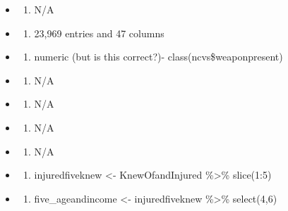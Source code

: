 \documentclass[
]{book}
\providecommand{\tightlist}{%
  \setlength{\itemsep}{0pt}\setlength{\parskip}{0pt}}
\begin{document}
\begin{itemize}
\item
  \begin{enumerate}
  \def\labelenumi{\arabic{enumi}.}
  \tightlist
  \item
    N/A
  \end{enumerate}
\item
  \begin{enumerate}
  \def\labelenumi{\arabic{enumi}.}
  \setcounter{enumi}{1}
  \tightlist
  \item
    23,969 entries and 47 columns
  \end{enumerate}
\item
  \begin{enumerate}
  \def\labelenumi{\arabic{enumi}.}
  \setcounter{enumi}{2}
  \tightlist
  \item
    numeric (but is this correct?)- class(ncvs\$weaponpresent)
  \end{enumerate}
\item
  \begin{enumerate}
  \def\labelenumi{\arabic{enumi}.}
  \setcounter{enumi}{3}
  \tightlist
  \item
    N/A
  \end{enumerate}
\item
  \begin{enumerate}
  \def\labelenumi{\arabic{enumi}.}
  \setcounter{enumi}{4}
  \tightlist
  \item
    N/A
  \end{enumerate}
\item
  \begin{enumerate}
  \def\labelenumi{\arabic{enumi}.}
  \setcounter{enumi}{5}
  \tightlist
  \item
    N/A
  \end{enumerate}
\item
  \begin{enumerate}
  \def\labelenumi{\arabic{enumi}.}
  \setcounter{enumi}{6}
  \tightlist
  \item
    N/A
  \end{enumerate}
\item
  \begin{enumerate}
  \def\labelenumi{\arabic{enumi}.}
  \setcounter{enumi}{7}
  \tightlist
  \item
    injuredfiveknew \textless- KnewOfandInjured \%\textgreater\% slice(1:5)
  \end{enumerate}
\item
  \begin{enumerate}
  \def\labelenumi{\arabic{enumi}.}
  \setcounter{enumi}{8}
  \tightlist
  \item
    five\_ageandincome \textless- injuredfiveknew \%\textgreater\% select(4,6)
  \end{enumerate}
\end{itemize}
\end{document}

